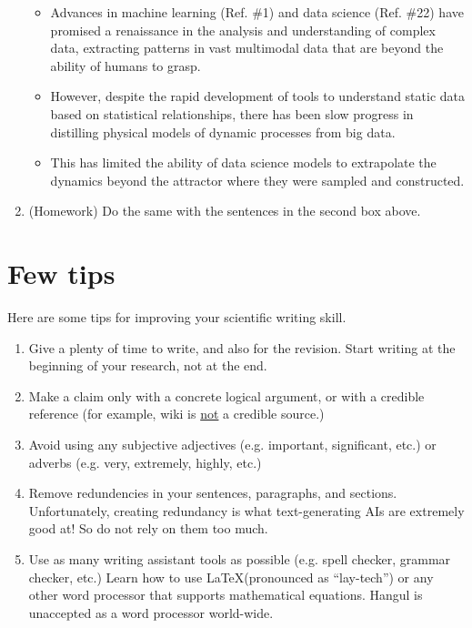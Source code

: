 \documentclass{article}
\begin{document}
\begin{enumerate}
    \begin{itemize}
        \item Advances in machine learning (Ref. \#1) and data science (Ref. \#22) have promised a renaissance in the analysis and understanding of complex data, extracting patterns in vast multimodal data that are beyond the ability of humans to grasp. 
        \vspace{1in}
        \item However, despite the rapid development of tools to understand static data based on statistical relationships, there has been slow progress in distilling physical models of dynamic processes from big data. 
        \vspace{1in}
        \item This has limited the ability of data science models to extrapolate the dynamics beyond the attractor where they were sampled and constructed. 
        \vspace{1in}
    \end{itemize}
    \item (Homework) Do the same with the sentences in the second box above.
\end{enumerate}



\section{Few tips}
Here are some tips for improving your scientific writing skill.
\begin{enumerate}
    \item Give a plenty of time to write, and also for the revision. Start writing at the beginning of your research, not at the end.
    \item Make a claim only with a concrete logical argument, or with a credible reference (for example, wiki is \underline{not} a credible source.)
    \item Avoid using any subjective adjectives (e.g. important, significant, etc.) or adverbs (e.g. very, extremely, highly, etc.)
    \item Remove redundencies in your sentences, paragraphs, and sections. Unfortunately, creating redundancy is what text-generating AIs are extremely good at! So do not rely on them too much.
    \item Use as many writing assistant tools as possible (e.g. spell checker, grammar checker, etc.) Learn how to use \LaTeX (pronounced as ``lay-tech'') or any other word processor that supports mathematical equations. Hangul\textsuperscript{\textregistered} is unaccepted as a word processor world-wide.
\end{enumerate}
\end{document}
